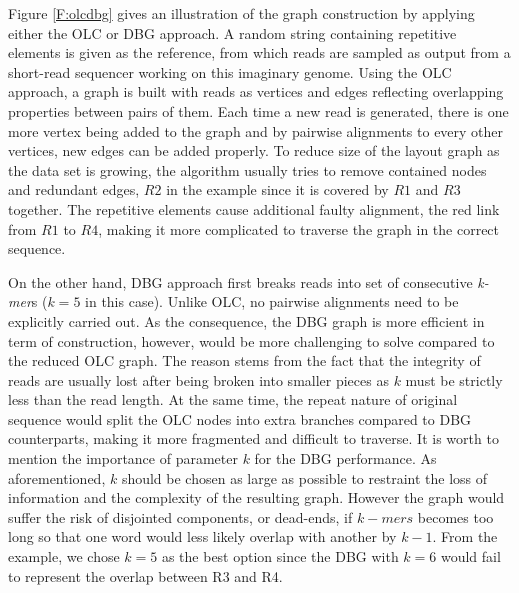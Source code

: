 Figure \ref{F:olcdbg} gives an illustration of the graph construction by applying either the OLC or DBG approach.
A random string containing repetitive elements is given as the reference, from which reads are sampled as output from a short-read sequencer working on this imaginary genome. 
Using the OLC approach, a graph is built with reads as vertices and edges reflecting overlapping properties between pairs of them. Each time a new read is generated, there is one more vertex being added to the graph and by pairwise alignments to every other vertices, new edges can be added properly. To reduce size of the layout graph as the data set is growing, the algorithm usually tries to remove contained nodes and redundant edges, \EG{} $R2$ in the example since it is covered by $R1$ and $R3$ together. The repetitive elements cause additional faulty alignment, \EG{} the red link from $R1$ to $R4$, making it more complicated to traverse the graph in the correct sequence.

On the other hand, DBG approach first breaks reads into set of consecutive \emph{k-mer}s ($k=5$ in this case).
Unlike OLC, no pairwise alignments need to be explicitly carried out. 
As the consequence, the DBG graph is more efficient in term of construction, however, would be more challenging to solve compared to the reduced OLC graph. The reason stems from the fact that the integrity of reads are usually lost after being broken into smaller pieces as $k$ must be strictly less than the read length. 
At the same time, the repeat nature of original sequence would split the OLC nodes into extra branches compared to DBG counterparts, making it more fragmented and difficult to traverse.
It is worth to mention the importance of parameter $k$ for the DBG performance. 
As aforementioned, $k$ should be chosen as large as possible to restraint the loss of information and the complexity of the resulting graph. However the graph would suffer the risk of disjointed components, or dead-ends, if $k-mers$ becomes too long so that one word would less likely overlap with another by $k-1$.
From the example, we chose $k=5$ as the best option since the DBG with $k=6$ would fail to represent the overlap between R3 and R4.

